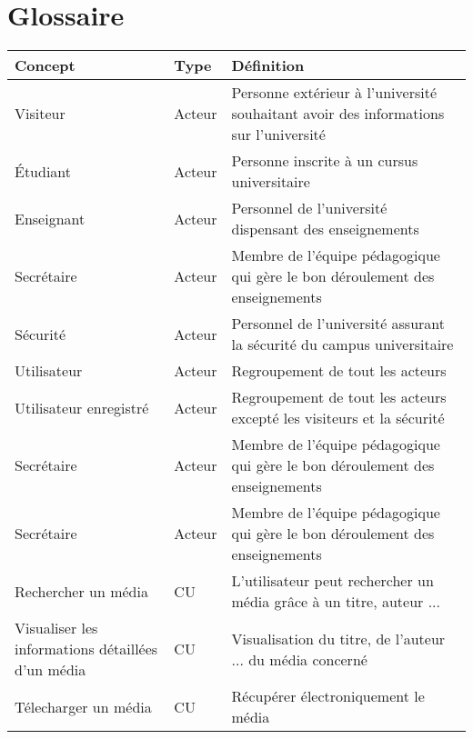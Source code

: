 \chapter{Glossaire}
\begin{center}
\begin{longtable}[c]{|p{100pt}| p{50pt}| p{250pt}|} 

	\hline
	\cellcolor{gray!40}\textbf{Concept}	& \cellcolor{gray!40}\textbf{Type} & \cellcolor{gray!40}\textbf{Définition}\\ \hline
	
	Visiteur	&	Acteur	& Personne extérieur à l'université souhaitant avoir des informations sur l'université\\ \hline
	
	Étudiant	&	Acteur	& Personne inscrite à un cursus universitaire\\ \hline
	
	Enseignant	&	Acteur	& Personnel de l'université dispensant des enseignements\\ \hline
	
	Secrétaire	&	Acteur	& Membre de l'équipe pédagogique qui gère le bon déroulement des enseignements\\ \hline
	
	Sécurité	&	Acteur	& Personnel de l'université assurant la sécurité du campus universitaire\\ \hline
	
	Utilisateur	&	Acteur	& Regroupement de tout les acteurs\\ \hline
	
	Utilisateur enregistré	&	Acteur	& Regroupement de tout les acteurs excepté les visiteurs et la sécurité\\ \hline
	
	Secrétaire	&	Acteur	& Membre de l'équipe pédagogique qui gère le bon déroulement des enseignements\\ \hline
	
	Secrétaire	&	Acteur	& Membre de l'équipe pédagogique qui gère le bon déroulement des enseignements\\ \hline
	
	Rechercher un média	&	CU	& L'utilisateur peut rechercher un média grâce à un titre, auteur ...\\ \hline
	
	Visualiser les informations détaillées d'un média 	&	CU	& Visualisation du titre, de l'auteur ... du média concerné\\ \hline
	
	Télecharger un média 	&	CU	& Récupérer électroniquement le média\\ \hline
	

\end{longtable}
\end{center}
